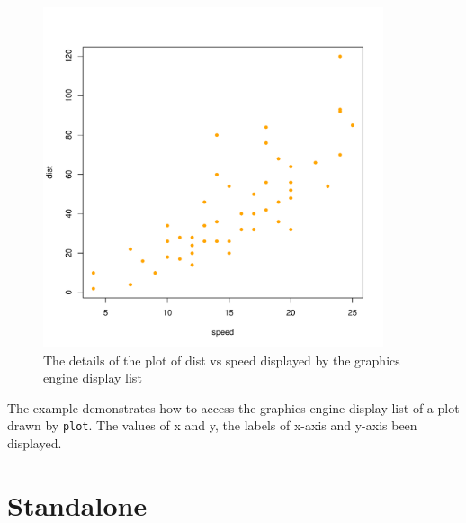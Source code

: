 \documentclass[paper=a4, fontsize=11pt]{report}
\begin{document}
\begin{figure}[h]
\begin{center}
  \includegraphics[height = 10cm, width = 10cm]{figure/report_3.pdf}
  \caption{The details of the plot of dist vs speed displayed by the graphics engine display list}
  	\label{figure4}
\end{center}
\end{figure}

The example demonstrates how to access the graphics engine display list of a plot drawn by \texttt{plot}. The values of x and y, the labels of x-axis and y-axis been displayed.



\chapter{Standalone}
\end{document}
